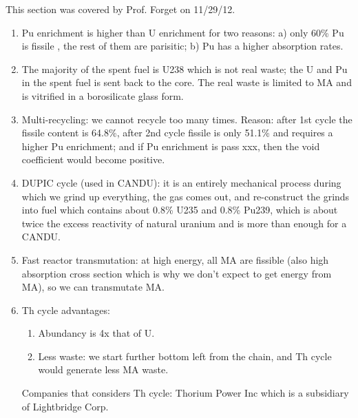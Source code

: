 \documentclass{school-22.211-notes}
\begin{document}
\clearpage
{}
This section was covered by Prof. Forget on 11/29/12. 
\begin{enumerate}

\item Pu enrichment is higher than U enrichment for two reasons: a) only 60\% Pu is fissile , the rest of them are parisitic; b) Pu has a higher absorption rates. 

\item The majority of the spent fuel is U238 which is not real waste; the U and Pu in the spent fuel is sent back to the core. The real waste is limited to MA and is vitrified in a borosilicate glass form. 

\item Multi-recycling: we cannot recycle too many times. Reason: after 1st cycle the fissile content is 64.8\%, after 2nd cycle fissile is only 51.1\% and requires a higher Pu enrichment; and if Pu enrichment is pass xxx, then the void coefficient would become positive. 

\item DUPIC cycle (used in CANDU): it is an entirely mechanical process during which we grind up everything, the gas comes out, and re-construct the grinds into fuel which contains about 0.8\% U235 and 0.8\% Pu239, which is about twice the excess reactivity of natural uranium and is more than enough for a CANDU.

\item Fast reactor transmutation: at high energy, all MA are fissible (also high absorption cross section which is why we don't expect to get energy from MA), so we can transmutate MA.  


\item Th cycle advantages: 
\begin{enumerate}
\item Abundancy is 4x that of U. 
\item Less waste:  we start further bottom left from the chain, and Th cycle would generate less MA waste. 

\end{enumerate}
Companies that considers Th cycle: Thorium Power Inc which is a subsidiary of Lightbridge Corp. 
\end{enumerate}
\end{document}
